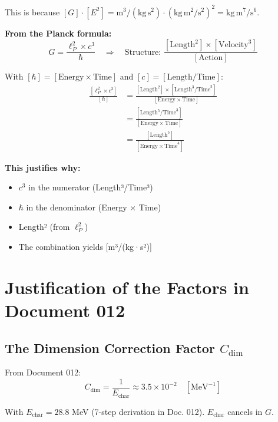 	This is because $[G]\cdot[E^2] = \text{m}^3/(\text{kg}\,\text{s}^2) \cdot (\text{kg}\,\text{m}^2/\text{s}^2)^2 = \text{kg}\,\text{m}^7/\text{s}^6$.
	
	\textbf{From the Planck formula:}
	\begin{equation}
		G = \frac{\ell_P^2 \times c^3}{\hbar} \quad \Rightarrow \quad \text{Structure: } \frac{[\text{Length}^2] \times [\text{Velocity}^3]}{[\text{Action}]}
	\end{equation}
	
	With $[\hbar] = [\text{Energy} \times \text{Time}]$ and $[c] = [\text{Length}/\text{Time}]$:
	\begin{align}
		\frac{[\ell_P^2 \times c^3]}{[\hbar]} &= \frac{[\text{Length}^2] \times [\text{Length}^3/\text{Time}^3]}{[\text{Energy} \times \text{Time}]} \\
		&= \frac{[\text{Length}^5/\text{Time}^3]}{[\text{Energy} \times \text{Time}]} \\
		&= \frac{[\text{Length}^5]}{[\text{Energy} \times \text{Time}^4]}
	\end{align}
	
	\textbf{This justifies why:}
	\begin{itemize}
		\item $c^3$ in the numerator (Length³/Time³)
		\item $\hbar$ in the denominator (Energy × Time)
		\item Length² (from $\ell_P^2$)
		\item The combination yields [m³/(kg·s²)]
	\end{itemize}
	
	\section{Justification of the Factors in Document 012}
	
	\subsection{The Dimension Correction Factor $C_{\text{dim}}$}
	
	From Document 012:
	\begin{equation}
		C_{\text{dim}} = \frac{1}{E_{\text{char}}} \approx 3.5 \times 10^{-2} \quad [\text{MeV}^{-1}]
	\end{equation}
	
	With $E_{\text{char}} = 28.8$ MeV (7-step derivation in Doc. 012). $E_{\text{char}}$ cancels in $G$.
	
